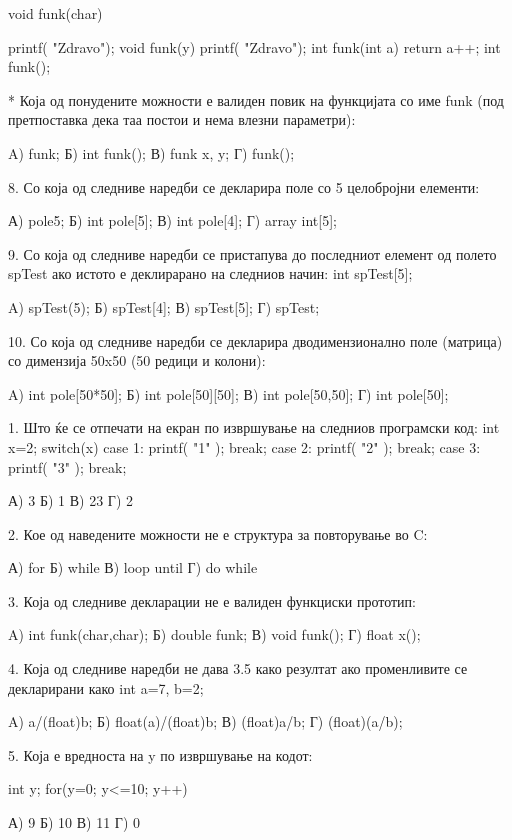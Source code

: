 {void funk(char) { printf( "Zdravo");
void funk(y) { printf( "Zdravo"); } 
int funk(int a) {return a++;}        
int funk();

* Која од понудените можности е валиден повик на функцијата со име funk (под претпоставка дека таа постои и нема влезни параметри):

A) funk;                    Б) int funk();
В) funk x, y;               Г) funk();

8. Со која од следниве наредби се декларира поле со 5 целобројни елементи:

А) pole{5};             Б) int pole[5];
В) int pole[4];             Г) array int[5];

9. Со која од следниве наредби се пристапува до последниот елемент од полето spTest ако истото е деклирарано на следниов начин: int spTest[5];

A) spTest(5);               Б) spTest[4];
В) spTest[5];               Г) spTest;

10. Со која од следниве наредби се декларира дводимензионално поле (матрица) со димензија 50x50 (50 редици и колони):

A) int pole[50*50];         Б) int pole[50][50];
В) int pole[50,50];         Г) int pole[50];

1. Што ќе се отпечати на екран по извршување на следниов програмски код:
int x=2;
switch(x)
{
  case 1: printf( "1" ); break;
  case 2: printf( "2" ); break;
  case 3: printf( "3" ); break;
}

А) 3                    Б) 1
В) 23                   Г) 2   

2. Кое од наведените можности не е структура за повторување во C:

А) for                  Б) while
В) loop until               Г) do while

3. Која од следниве декларации не е валиден функциски прототип:

A) int funk(char,char);     Б) double funk;
В) void funk();             Г) float x();

4. Која од следниве наредби не дава 3.5 како резултат ако променливите се декларирани како int a=7, b=2;

A) a/(float)b;                  Б) float(a)/(float)b;
В) (float)a/b;                  Г) (float)(a/b);

5. Која е вредноста на y по извршување на кодот: 

int y; for(y=0; y<=10; y++) {} 

А) 9                        Б) 10
В) 11                       Г) 0



}}
